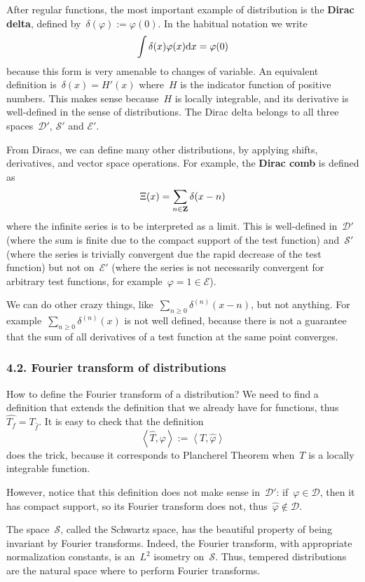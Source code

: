 After regular functions, the most important example of distribution
is the {\bf Dirac delta}, defined by~$\delta(\varphi):=\varphi(0)$.
In the habitual notation we write
$$
\int\delta(x)\varphi(x)\mathrm{d} x = \varphi(0)
$$
because this form is very amenable to changes of variable.
An equivalent definition is~$\delta(x)=H'(x)$ where~$H$ is the
indicator function of positive numbers.  This makes sense because~$H$
is locally integrable, and its derivative is well-defined in the
sense of distributions.  The Dirac delta belongs to all three
spaces~$\mathcal{D}'$, $\mathcal{S}'$ and $\mathcal{E}'$.

From Diracs, we can define many other distributions, by applying
shifts, derivatives, and vector space operations.  For example, the
{\bf Dirac comb} is defined as
$$
\Xi(x)=\sum_{n\in\mathbf{Z}}\delta(x-n)
$$
where the infinite series is to be interpreted as a limit.  This is
well-defined in~$\mathcal{D}'$ (where the sum is finite due to the
compact support of the test function)
and~$\mathcal{S}'$ (where the series is trivially convergent due the
rapid decrease of the test function) but not on~$\mathcal{E}'$ (where
the series is not necessarily convergent for arbitrary test
functions, for example~$\varphi=1\in\mathcal{E}$).

We can do other crazy things, like~$\sum_{n\ge 0}\delta^{(n)}(x-n)$,
but not anything.  For example~$\sum_{n\ge 0}\delta^{(n)}(x)$ is not
well defined, because there is not a guarantee that the sum of all
derivatives of a test function at the same point converges.

\subsubsection{4.2. Fourier transform of distributions}

How to define the Fourier transform of a distribution?
We need to find a definition that extends the definition that we
already have for functions, thus~$\widehat{T_f}=T_{\widehat{f}}$.
It is easy to check that the definition
$$
\left<\widehat{T},\varphi\right>
:=
\left<T,\widehat{\varphi}\right>
$$
does the trick, because it corresponds to Plancherel Theorem when~$T$
is a locally integrable function.

However, notice that this definition does not make sense
in~$\mathcal{D}'$:  if~$\varphi\in\mathcal{D}$, then it has compact
support, so its Fourier transform does not,
thus~$\widehat{\varphi}\not\in\mathcal{D}$.

The space~$\mathcal{S}$, called the Schwartz space, has the beautiful
property of being invariant by Fourier transforms.  Indeed, the Fourier
transform, with appropriate normalization constants, is an~$L^2$
isometry on~$\mathcal{S}$.  Thus, tempered distributions are the
natural space where to perform Fourier transforms.


